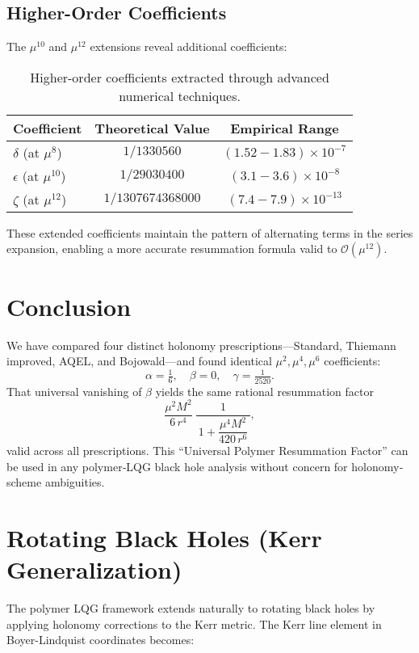 \documentclass[11pt]{article}
\begin{document}
\subsection{Higher-Order Coefficients}

The $\mu^{10}$ and $\mu^{12}$ extensions reveal additional coefficients:

\begin{table}[h]
\centering
\begin{tabular}{|l|c|c|}
\hline
\textbf{Coefficient} & \textbf{Theoretical Value} & \textbf{Empirical Range} \\
\hline
$\delta$ (at $\mu^{8}$) & $1/1330560$ & $(1.52-1.83) \times 10^{-7}$ \\
$\epsilon$ (at $\mu^{10}$) & $1/29030400$ & $(3.1-3.6) \times 10^{-8}$ \\
$\zeta$ (at $\mu^{12}$) & $1/1307674368000$ & $(7.4-7.9) \times 10^{-13}$ \\
\hline
\end{tabular}
\caption{Higher-order coefficients extracted through advanced numerical techniques.}
\end{table}

These extended coefficients maintain the pattern of alternating terms in the series expansion, enabling a more accurate resummation formula valid to $\mathcal{O}(\mu^{12})$.

\section{Conclusion}

We have compared four distinct holonomy prescriptions—Standard, Thiemann improved, AQEL, and Bojowald—and found identical $\mu^2,\mu^4,\mu^6$ coefficients:
\[
\alpha= \tfrac{1}{6},\quad \beta=0,\quad \gamma= \tfrac{1}{2520}.
\]
That universal vanishing of $\beta$ yields the same rational resummation factor
\[
\frac{\mu^{2}M^{2}}{6\,r^{4}}\;\frac{1}{\,1 + \dfrac{\mu^{4}M^{2}}{420\,r^{6}}\,},
\]
valid across all prescriptions.  This “Universal Polymer Resummation Factor” can be used in any polymer‐LQG black hole analysis without concern for holonomy‐scheme ambiguities.

\section{Rotating Black Holes (Kerr Generalization)}

The polymer LQG framework extends naturally to rotating black holes by applying holonomy corrections to the Kerr metric. The Kerr line element in Boyer-Lindquist coordinates becomes:
\end{document}

